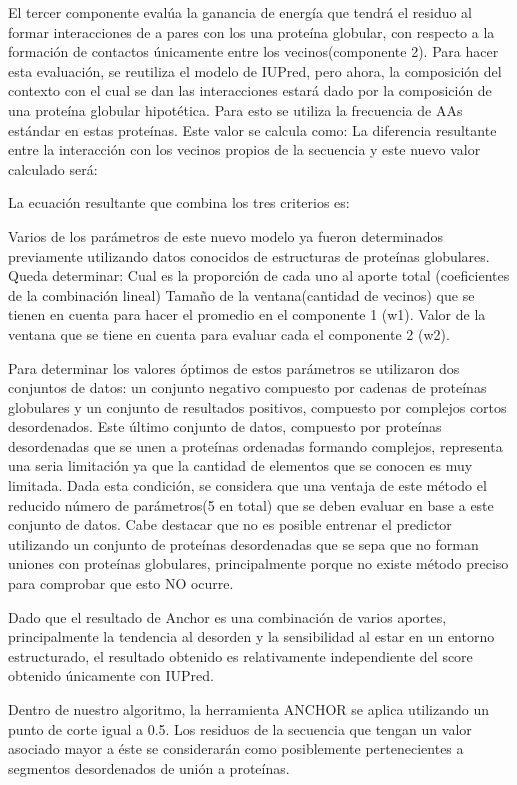 El tercer componente evalúa la ganancia de energía que tendrá el residuo al formar interacciones de a pares con los una proteína globular, con respecto a la formación de contactos únicamente entre los vecinos(componente 2). Para hacer esta evaluación, se reutiliza el modelo de IUPred, pero ahora, la composición del contexto con el cual se dan las interacciones estará dado por la composición de una proteína globular hipotética. Para esto se utiliza la frecuencia de AAs estándar en estas proteínas. Este valor se calcula como:
La diferencia resultante entre la interacción con los vecinos propios de la secuencia y este nuevo valor calculado será:
    

La ecuación resultante que combina los tres criterios es:

  
  
Varios de los parámetros de este nuevo modelo ya fueron determinados previamente utilizando datos conocidos de estructuras de proteínas globulares. Queda determinar:
Cual es la proporción de cada uno al aporte total (coeficientes de la combinación lineal) 
Tamaño de la ventana(cantidad de vecinos) que se tienen en cuenta para hacer el promedio en el componente 1 (w1).
Valor de la ventana que se tiene en cuenta para evaluar cada el componente 2 (w2).

Para determinar los valores óptimos de estos parámetros se utilizaron dos conjuntos de datos: un conjunto negativo compuesto por cadenas de proteínas globulares y un conjunto de resultados
positivos, compuesto por complejos cortos desordenados. Este último conjunto de datos, compuesto por proteínas desordenadas que se unen a proteínas ordenadas formando complejos,
representa una seria limitación ya que la cantidad de elementos que se conocen es muy limitada. Dada esta condición, se considera que una ventaja de este método el reducido número de 
parámetros(5 en total) que se deben evaluar en base a este conjunto de datos.
Cabe destacar que no es posible entrenar el predictor utilizando un conjunto de proteínas desordenadas que se sepa que no forman uniones con proteínas globulares, principalmente 
porque no existe método preciso para comprobar que esto NO ocurre.

Dado que el resultado de Anchor es una combinación de varios aportes, principalmente la tendencia al desorden y la sensibilidad al estar en un entorno estructurado, 
el resultado obtenido es relativamente independiente del score obtenido únicamente con IUPred. 

Dentro de nuestro algoritmo, la herramienta ANCHOR se aplica utilizando un punto de corte igual a 0.5. Los residuos de la secuencia que tengan un valor asociado mayor a 
éste se considerarán como posiblemente pertenecientes a segmentos desordenados de unión a proteínas.   







